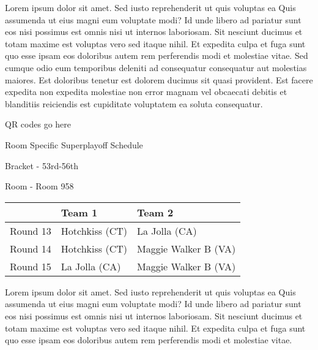 \documentclass{article}%
\begin{document}
\newline%
Lorem ipsum dolor sit amet. Sed iusto reprehenderit ut quis voluptas ea Quis assumenda ut eius magni eum voluptate modi? Id unde libero ad pariatur sunt eos nisi possimus est omnis nisi ut internos laboriosam. Sit nesciunt ducimus et totam maxime est voluptas vero sed itaque nihil. Et expedita culpa et fuga sunt quo esse ipsam eos doloribus autem rem perferendis modi et molestiae vitae.\newline%
\newline%
Sed cumque odio eum temporibus deleniti ad consequatur consequatur aut molestias maiores. Est doloribus tenetur est dolorem ducimus sit quasi provident. Est facere expedita non expedita molestiae non error magnam vel obcaecati debitis et blanditiis reiciendis est cupiditate voluptatem ea soluta consequatur.%
\vspace*{140pt}%
\begin{center}%
\begin{Huge}%
QR codes go here%
\end{Huge}%
\end{center}%
\newpage%
\begin{center}%
\begin{Huge}%
Room Specific Superplayoff Schedule%
\end{Huge}%
\vspace*{8pt}%
\linebreak%
\begin{Large}%
Bracket {-} 53rd{-}56th%
\end{Large}%
\vspace*{8pt}%
\linebreak%
\vspace*{8pt}%
\begin{Large}%
Room {-} Room 958%
\end{Large}%
\end{center}%
%
\begin{tabularx}{\textwidth}{|c|Y|Y|}%
\hline%
&Team 1&Team 2\\%
\hline%
Round 13&Hotchkiss (CT)&La Jolla (CA)\\%
Round 14&Hotchkiss (CT)&Maggie Walker B (VA)\\%
Round 15&La Jolla (CA)&Maggie Walker B (VA)\\%
\hline%
\end{tabularx}%
\vspace*{8pt}%
\newline%
Lorem ipsum dolor sit amet. Sed iusto reprehenderit ut quis voluptas ea Quis assumenda ut eius magni eum voluptate modi? Id unde libero ad pariatur sunt eos nisi possimus est omnis nisi ut internos laboriosam. Sit nesciunt ducimus et totam maxime est voluptas vero sed itaque nihil. Et expedita culpa et fuga sunt quo esse ipsam eos doloribus autem rem perferendis modi et molestiae vitae.\newline%
\end{document}
